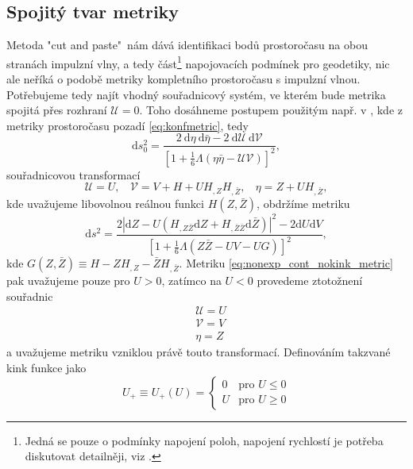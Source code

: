 \subsection{Spojitý tvar metriky}
Metoda "cut and paste"\ nám dává identifikaci bodů prostoročasu na obou stranách impulzní vlny, a tedy část\footnote{Jedná se pouze o podmínky napojení poloh, napojení rychlostí
je potřeba diskutovat detailněji, viz \cite{Podolsky:2014ysa}.} napojovacích podmínek
pro geodetiky, nic ale neříká o podobě metriky kompletního prostoročasu s impulzní vlnou. Potřebujeme tedy najít vhodný
souřadnicový systém, ve kterém bude metrika spojitá přes rozhraní $\mathcal{U}=0$. Toho dosáhneme postupem použitým např. v
\cite{Podolsky:2014ysa}, kde z metriky prostoročasu pozadí \eqref{eq:konfmetric}, tedy
\begin{equation}
    \label{eq:null_background_metric}
    \mathrm{d}s_0^2 = \frac{2~\mathrm{d}\eta~\mathrm{d}\bar{\eta}-2~\mathrm{d}\mathcal{U}~\mathrm{d}\mathcal{V}}
    {\left[1+\frac{1}{6}\Lambda \left(\eta \bar{\eta}
    -\mathcal{U}\mathcal{V}\right)\right]^2},
\end{equation}
souřadnicovou transformací
\begin{equation}
    \label{eq:nonexp_cont_transform}
    \mathcal{U}=U,~~~~ \mathcal{V}=V+H+UH_{,Z}H_{,\bar{Z}},~~~~ \eta=Z+UH_{,\bar{Z}},
\end{equation}
kde uvažujeme libovolnou reálnou funkci $H(Z, \bar{Z})$, obdržíme metriku
\begin{equation}
    \label{eq:nonexp_cont_nokink_metric}
    \mathrm{d} s^{2}=\frac{2\left|\mathrm{d} Z-U\left(H_{, Z \bar{Z}} 
    \mathrm{d} Z+H_{, \bar{Z} \bar{Z}} \mathrm{d} \bar{Z}\right)\right|^{2}-2 \mathrm{d} U 
    \mathrm{d} V}{\left[1+\frac{1}{6} \Lambda(Z \bar{Z}-U V-U G)\right]^{2}},
\end{equation}
kde $G(Z, \bar{Z}) \equiv H - Z H_{,Z}-\bar{Z}H_{,\bar{Z}}$. Metriku \eqref{eq:nonexp_cont_nokink_metric} pak 
uvažujeme pouze pro $U>0$, zatímco na $U<0$ provedeme ztotožnení souřadnic
\begin{equation}
    \label{eq:transformation_just_rename}
    \begin{split}
        &\mathcal{U} = U \\
        &\mathcal{V} = V \\
        &\eta = Z
    \end{split}
\end{equation}
a uvažujeme metriku vzniklou právě touto transformací.
Definováním takzvané kink funkce jako
\begin{equation}
    \label{eq:kink_function}
    U_+ \equiv U_+(U) = \begin{cases}
        0 & \text{pro } U \leq 0 \\
        U & \text{pro } U \geq 0
    \end{cases}
\end{equation}
